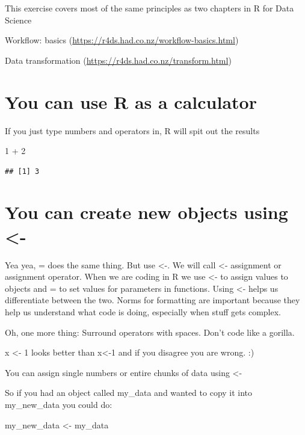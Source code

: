 \documentclass[
]{book}
\newenvironment{Shaded}{\begin{snugshade}}{\end{snugshade}}
\newcommand{\DecValTok}[1]{\textcolor[rgb]{0.00,0.00,0.81}{#1}}
\newcommand{\SpecialCharTok}[1]{\textcolor[rgb]{0.00,0.00,0.00}{#1}}
\begin{document}
This exercise covers most of the same principles as two chapters in R for Data Science

Workflow: basics (\url{https://r4ds.had.co.nz/workflow-basics.html})

Data transformation (\url{https://r4ds.had.co.nz/transform.html})

\hypertarget{you-can-use-r-as-a-calculator}{%
\section{You can use R as a calculator}\label{you-can-use-r-as-a-calculator}}

If you just type numbers and operators in, R will spit out the results

\begin{Shaded}
\begin{Highlighting}[]
\DecValTok{1} \SpecialCharTok{+} \DecValTok{2}
\end{Highlighting}
\end{Shaded}

\begin{verbatim}
## [1] 3
\end{verbatim}

\hypertarget{you-can-create-new-objects-using--}{%
\section{You can create new objects using \textless-}\label{you-can-create-new-objects-using--}}

Yea yea, = does the same thing. But use \textless-. We will call \textless- assignment or assignment operator. When we are coding in R we use \textless- to assign values to objects and = to set values for parameters in functions. Using \textless- helps us differentiate between the two. Norms for formatting are important because they help us understand what code is doing, especially when stuff gets complex.

Oh, one more thing: Surround operators with spaces. Don't code like a gorilla.

x \textless- 1 looks better than x\textless-1 and if you disagree you are wrong. :)

You can assign single numbers or entire chunks of data using \textless-

So if you had an object called my\_data and wanted to copy it into my\_new\_data you could do:

my\_new\_data \textless- my\_data
\end{document}
